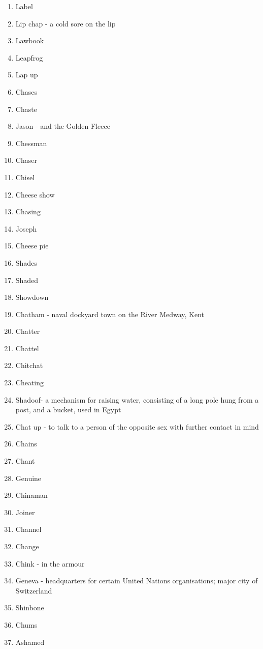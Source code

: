 \begin{enumerate}
        \item Label
        \item Lip chap - a cold sore on the lip
        \item Lawbook
        \item Leapfrog
        \item Lap up
        \item Chases
        \item Chaste
        \item Jason - and the Golden Fleece
        \item Chessman
        \item Chaser
        \item Chisel
        \item Cheese show
        \item Chasing
        \item Joseph
        \item Cheese pie
        \item Shades
        \item Shaded
        \item Showdown
        \item Chatham - naval dockyard town on the River Medway, Kent
        \item Chatter
        \item Chattel
        \item Chitchat
        \item Cheating
        \item Shadoof- a mechanism for raising water, consisting of a long pole hung from a post, and a bucket, used in Egypt
        \item Chat up - to talk to a person of the opposite sex with further contact in mind
        \item Chains
        \item Chant
        \item Genuine
        \item Chinaman
        \item Joiner
        \item Channel
        \item Change
        \item Chink - in the armour
        \item Geneva - headquarters for certain United Nations organisations; major city of Switzerland
        \item Shinbone
        \item Chums
        \item Ashamed

\end{enumerate}
